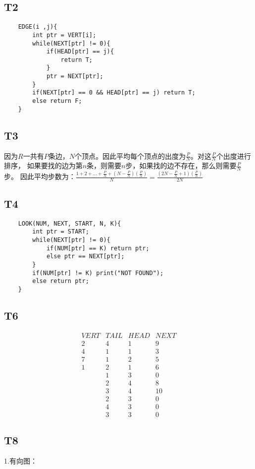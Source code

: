 \documentclass{article}
\begin{document}
\subsection{T2}
\begin{lstlisting}
    EDGE(i ,j){
        int ptr = VERT[i];
        while(NEXT[ptr] != 0){
            if(HEAD[ptr] == j){
                return T;
            }
            ptr = NEXT[ptr];
        }
        if(NEXT[ptr] == 0 && HEAD[ptr] == j) return T;
        else return F;
    }
\end{lstlisting}
\subsection{T3}
因为$R$一共有$P$条边，$N$个顶点。因此平均每个顶点的出度为$\frac{P}{N}$。对这$\frac{P}{N}$个出度进行排序，
如果要找的边为第$n$条，则需要$n$步，如果找的边不存在，那么则需要$\frac{P}{N}$步。
因此平均步数为：$\frac{1 + 2 + \dots + \frac{P}{N} + (N - \frac{P}{N})(\frac{P}{N})}{N} = \frac{(2N - \frac{P}{N} + 1)(\frac{P}{N})}{2N}$
\subsection{T4}
\begin{lstlisting}
    LOOK(NUM, NEXT, START, N, K){
        int ptr = START;
        while(NEXT[ptr] != 0){
            if(NUM[ptr] == K) return ptr;
            else ptr == NEXT[ptr];
        }
        if(NUM[ptr] != K) print("NOT FOUND");
        else return ptr;
    }
\end{lstlisting}
\subsection{T6}
$$
\begin{array}{|c|c|c|c|}
    VERT & TAIL & HEAD & NEXT\\
    \hline
    2 & 4 & 1 & 9\\
    4 & 1 & 1 & 3 \\
    7 & 1 & 2 & 5\\
    1 & 2 & 1 & 6\\
    \  & 1 & 3 & 0\\
    \  & 2 & 4 & 8\\
    \  & 3 & 4 & 10\\
    \  & 2 & 3 & 0\\
    \  & 4 & 3 & 0\\
    \  & 3 & 3 & 0
\end{array}
$$
\subsection{T8}
1.有向图：\\
\end{document}
